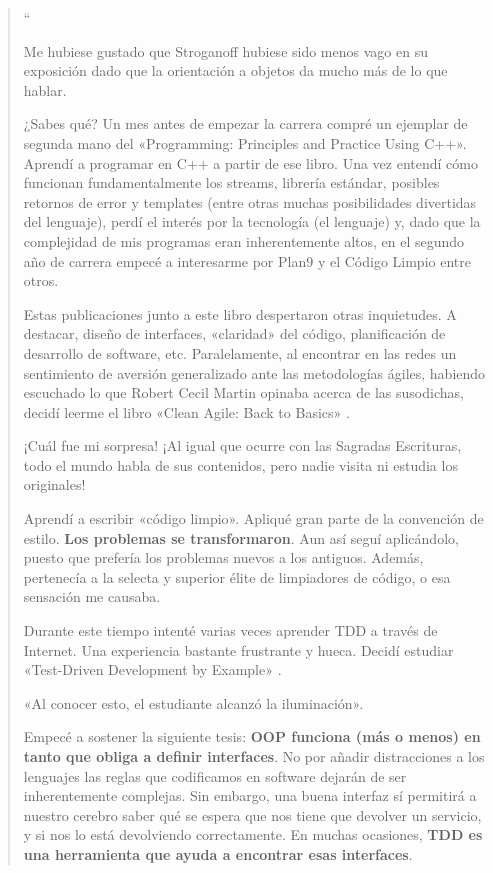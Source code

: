 \begin{quote}
``\itshape{%
    Me hubiese gustado que Stroganoff hubiese sido menos vago en su exposición dado
    que la orientación a objetos da mucho más de lo que hablar.

    ¿Sabes qué? Un mes antes de empezar la carrera compré un ejemplar de segunda mano
    del «Programming: Principles and Practice Using C++». \cite{Stroganoff} Aprendí a
    programar en C++ a partir de ese libro. Una vez entendí cómo funcionan fundamentalmente
    los streams, librería estándar, posibles retornos de error y templates (entre otras
    muchas posibilidades divertidas del lenguaje), perdí el interés por la tecnología
    (el lenguaje) y, dado que la complejidad de mis programas eran inherentemente altos,
    en el segundo año de carrera empecé a interesarme por Plan9 \cite{Plan9} y el
    Código Limpio \cite{CleanCode} entre otros.

    Estas publicaciones junto a este libro despertaron otras inquietudes. A destacar,
    diseño de interfaces, «claridad» del código, planificación de desarrollo de software,
    etc. Paralelamente, al encontrar en las redes un sentimiento de aversión generalizado
    ante las metodologías ágiles, habiendo escuchado lo que Robert Cecil Martin opinaba
    acerca de las susodichas, decidí leerme el libro «Clean Agile: Back to Basics» \cite{AgileBackToBasics}.

    ¡Cuál fue mi sorpresa! ¡Al igual que ocurre con las Sagradas Escrituras, todo el mundo 
    habla de sus contenidos, pero nadie visita ni estudia los originales!

    Aprendí a escribir «código limpio». Apliqué gran parte de la convención de estilo.
    \textbf{Los problemas se transformaron}. Aun así seguí aplicándolo, puesto que
    prefería los problemas nuevos a los antiguos. Además, pertenecía a la selecta y
    superior élite de limpiadores de código, o esa sensación me causaba.

    Durante este tiempo intenté varias veces aprender TDD a través de Internet. Una
    experiencia bastante frustrante y hueca. Decidí estudiar «Test-Driven Development
    by Example» \cite{TDD}.

    «Al conocer esto, el estudiante alcanzó la iluminación».

    Empecé a sostener la siguiente tesis: \textbf{OOP funciona (más o menos) en tanto
    que obliga a definir interfaces}. No por añadir distracciones a los lenguajes las
    reglas que codificamos en software dejarán de ser inherentemente complejas.
    Sin embargo, una buena interfaz sí permitirá a nuestro cerebro saber qué se espera
    que nos tiene que devolver un servicio, y si nos lo está devolviendo correctamente.
    En muchas ocasiones, \textbf{TDD es una herramienta que ayuda a encontrar esas
    interfaces}.

}
\end{quote}
